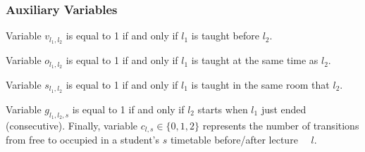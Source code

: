 \subsubsection{Auxiliary Variables} Variable $v_{l_1,l_2}$ is equal to 1 if and only if $l_1$ is taught before $l_2$. 
\begin{comment}
v_{l_1,l_2}= \begin{cases}
  1 & \textrm{if} \ a^{l_1} + len_{l_1} \leq a^{l_2}\\
  0 & \textrm{otherwise}  \end{cases}  \forall_{l_1\in L, l_2\in L}.  
\end{comment}
Variable $o_{l_1,l_2}$ is equal to 1 if and only if $l_1$ is taught at the same time as $l_2$.
\begin{comment}
o_{l_1,l_2}= \begin{cases}
  1 & \textrm{if} \  v_{l_1,l_2} + v_{l_2,l_1} = 0\\
  0 & \textrm{otherwise}  \end{cases}  \forall_{l_1\in L, l_2\in L}.  
\end{comment}
Variable $s_{l_1,l_2}$ is equal to 1 if and only if $l_1$ is taught in the same room that $l_2$. 
\begin{comment}
s_{l_1,l_2}= \begin{cases}
  1 & \textrm{if} \ x_{l_1,r} = x_{l_2,r}\\
  0 & \textrm{otherwise}  \end{cases}   \forall_{l_1\in L, l_2\in L, r \in R}.
\end{comment}
Variable $g_{l_1,l_2,s}$ is equal to 1 if and only if $l_2$ starts when $l_1$ just ended (consecutive). Finally, variable $c_{l,s} \in \{0,1,2\}$ represents the number of transitions from free to occupied in a student's $s$ timetable before/after lecture~ ~$l$. 
\begin{comment}
g_{l_1,l_2,s}= \begin{cases}
  1 & \textrm{if} \  a^{l_1} + len_{l_1} = a^{l_2}\\
  0 & \textrm{otherwise}  \end{cases}  \forall_{l_1\in S_l, l_2\in S_l, s\in S}.  
\end{comment}
\begin{comment}
c_{l,s}= \begin{cases}
  1 & \textrm{if} \  \sum_{l_2 \in S_l}v_{l,l_2} + \sum_{l_2 \in S_l} v_{l_2,l}\\
  0 & \textrm{otherwise}  \end{cases}  \forall_{l\in S_l, s\in S}.  
\end{comment}


